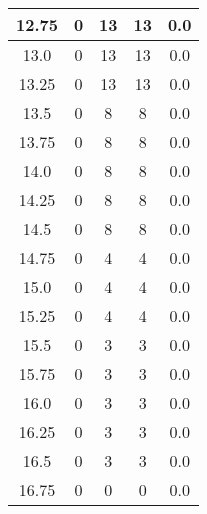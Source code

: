\documentclass[letterpaper, 12pt]{article}
\begin{document}
\begin{longtable}{|c|c|c|c|c|}
\hline
12.75 & 0 & 13 & 13 & 0.0 \\
\hline
13.0 & 0 & 13 & 13 & 0.0 \\
\hline
13.25 & 0 & 13 & 13 & 0.0 \\
\hline
13.5 & 0 & 8 & 8 & 0.0 \\
\hline
13.75 & 0 & 8 & 8 & 0.0 \\
\hline
14.0 & 0 & 8 & 8 & 0.0 \\
\hline
14.25 & 0 & 8 & 8 & 0.0 \\
\hline
14.5 & 0 & 8 & 8 & 0.0 \\
\hline
14.75 & 0 & 4 & 4 & 0.0 \\
\hline
15.0 & 0 & 4 & 4 & 0.0 \\
\hline
15.25 & 0 & 4 & 4 & 0.0 \\
\hline
15.5 & 0 & 3 & 3 & 0.0 \\
\hline
15.75 & 0 & 3 & 3 & 0.0 \\
\hline
16.0 & 0 & 3 & 3 & 0.0 \\
\hline
16.25 & 0 & 3 & 3 & 0.0 \\
\hline
16.5 & 0 & 3 & 3 & 0.0 \\
\hline
16.75 & 0 & 0 & 0 & 0.0 \\
\hline
\end{longtable}
\end{document}
